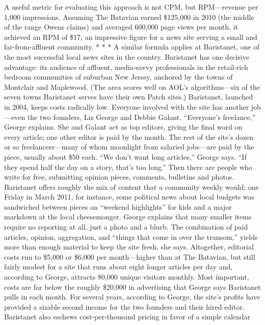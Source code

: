 A useful metric for evaluating this approach is not CPM, but RPM—revenue
per 1,000 impressions. Assuming The Batavian earned \$125,000 in 2010 (the
middle of the range Owens claims) and averaged 600,000 page views per month,
it achieved an RPM of \$17, an impressive figure for a news site serving a small
and far-from-affluent community.
* * *
A similar formula applies at Baristanet, one of the most successful local news
sites in the country. Baristanet has one decisive advantage: its audience of affluent,
media-savvy professionals in the retail-rich bedroom communities of suburban
New Jersey, anchored by the towns of Montclair and Maplewood. (The area
scores well on AOL’s algorithms—six of the seven towns Baristanet serves have
their own Patch sites.)
Baristanet, launched in 2004, keeps costs radically low. Everyone involved with
the site has another job—even the two founders, Liz George and Debbie Galant.
``Everyone’s freelance,'' George explains. She and Galant act as top editors, giving
the final word on every article; one other editor is paid by the month. The rest
of the site’s dozen or so freelancers—many of whom moonlight from salaried
jobs—are paid by the piece, usually about \$50 each. ``We don’t want long articles,''
George says. ``If they spend half the day on a story, that’s too long.''
Then there are people who write for free, submitting opinion pieces, comments,
bulletins and photos. Baristanet offers roughly the mix of content that a
community weekly would; one Friday in March 2011, for instance, some political
news about local budgets was sandwiched between pieces on ``weekend
highlights'' for kids and a major markdown at the local cheesemonger. George
explains that many smaller items require no reporting at all, just a photo and a
blurb. The combination of paid articles, opinion, aggregation, and ``things that
come in over the transom,'' yields more than enough material to keep the site
fresh, she says.
Altogether, editorial costs run to \$5,000 or \$6,000 per month—higher than at
The Batavian, but still fairly modest for a site that runs about eight longer articles
per day and, according to George, attracts 80,000 unique visitors monthly. Most
important, costs are far below the roughly \$20,000 in advertising that George
says Baristanet pulls in each month. For several years, according to George, the
site’s profits have provided a sizable second income for the two founders and
their hired editor.
Baristanet also eschews cost-per-thousand pricing in favor of a simple calendar

